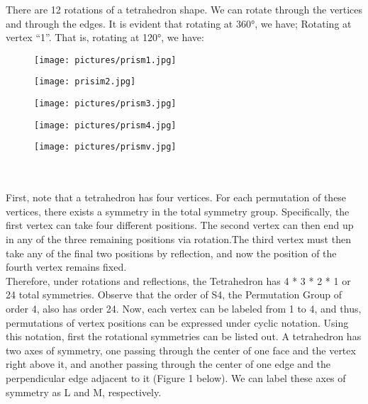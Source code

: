 \documentclass{article}
\begin{document}
There are 12 rotations of a tetrahedron shape. We can rotate through the vertices and through the edges. It is evident that rotating at 360°, we have; 
Rotating at vertex “1”. That is, rotating at 120°, we have:\\

 \begin{figure}[htp]
    \texttt{[image: pictures/prism1.jpg]}
\end{figure}

\vspace{7cm}
  \begin{figure}[htp]
    \texttt{[image: prisim2.jpg]}
\end{figure}
\vspace{7cm}
  \begin{figure}[htp]
    \texttt{[image: pictures/prism3.jpg]}
\end{figure}

  \begin{figure}[htp]
    \texttt{[image: pictures/prism4.jpg]}
\end{figure}

 \begin{figure}[htp]
    \texttt{[image: pictures/prismv.jpg]}
\end{figure}\\

\\
First, note that a tetrahedron has four vertices. For each permutation of these vertices, there exists a symmetry in the total symmetry group. Specifically, the first vertex can take four different positions. The second vertex can then end up in any of the three remaining positions via rotation.The third vertex must then take any of the final two positions by reflection, and now the position of the fourth vertex remains fixed. \\
Therefore, under rotations and reflections, the Tetrahedron has 4 * 3 * 2 * 1 or 24 total symmetries. Observe that the order of S4, the Permutation Group of order 4, also has order 24. Now, each vertex can be labeled from 1 to 4, and thus, permutations of vertex positions can be expressed under cyclic notation. Using this notation, first the rotational symmetries can be listed out. A tetrahedron has two axes of symmetry, one passing through the center of one face and the vertex right above it, and another passing through the center of one edge and the perpendicular edge adjacent to it (Figure 1 below). We can label these axes of symmetry as L and M, respectively.\\
\end{document}
